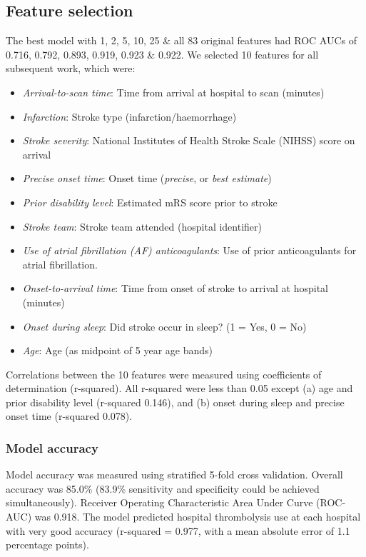 \subsection{Feature selection}

The best model with 1, 2, 5, 10, 25 \& all 83 original features had ROC AUCs of 0.716, 0.792, 0.893, 0.919, 0.923 \& 0.922. We selected 10 features for all subsequent work, which were:

\begin{itemize}
    \item \emph{Arrival-to-scan time}: Time from arrival at hospital to scan (minutes)
    \item \emph{Infarction}: Stroke type (infarction/haemorrhage)
    \item \emph{Stroke severity}: National Institutes of Health Stroke Scale (NIHSS) score on arrival
    \item \emph{Precise onset time}: Onset time (\textit{precise}, or \textit{best estimate})
    \item \emph{Prior disability level}: Estimated mRS score prior to stroke
    \item \emph{Stroke team}: Stroke team attended (hospital identifier)
    \item \emph{Use of atrial fibrillation (AF) anticoagulants}: Use of prior anticoagulants for atrial fibrillation.
    \item \emph{Onset-to-arrival time}: Time from onset of stroke to arrival at hospital (minutes)
    \item \emph{Onset during sleep}: Did stroke occur in sleep? (1 = Yes, 0 = No)
    \item \emph{Age}: Age (as midpoint of 5 year age bands)
\end{itemize}

Correlations between the 10 features were measured using coefficients of determination (r-squared). All r-squared were less than 0.05 except (a) age and prior disability level (r-squared 0.146), and (b) onset during sleep and precise onset time (r-squared 0.078).

\subsubsection{Model accuracy}

Model accuracy was measured using stratified 5-fold cross validation. Overall accuracy was 85.0\% (83.9\% sensitivity and specificity could be achieved simultaneously). Receiver Operating Characteristic Area Under Curve (ROC-AUC) was 0.918. The model predicted hospital thrombolysis use at each hospital with very good accuracy (r-squared = 0.977, with a mean absolute error of 1.1 percentage points).

